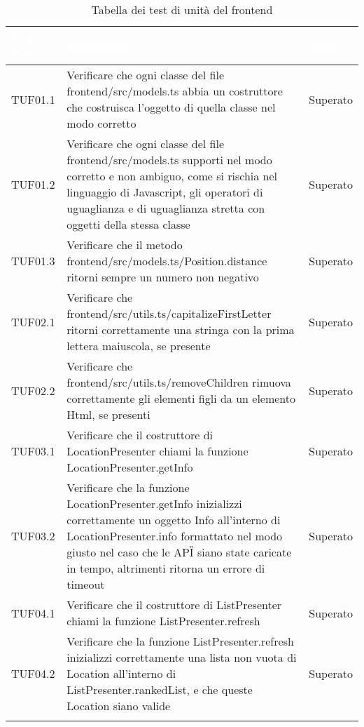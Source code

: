    {
        \setlength{\freewidth}{\dimexpr\textwidth-10\tabcolsep}
        \renewcommand{\arraystretch}{1.5}
        \centering
        \setlength{\aboverulesep}{0pt}
        \setlength{\belowrulesep}{0pt}
        \begin{longtable}{C{.3\freewidth} C{.5\freewidth} C{.3\freewidth}}
        \toprule
        \textcolor{white}{\textbf{Codice Test}}&
        \textcolor{white}{\textbf{Descrizione}}&
        \textcolor{white}{\textbf{Stato}}\\	
        \toprule
        \endhead

        TUF01.1 & Verificare che ogni classe del file frontend/src/models.ts
                abbia un costruttore che costruisca l'oggetto di quella classe nel modo corretto & Superato \\

        TUF01.2 & Verificare che ogni classe del file frontend/src/models.ts
                supporti nel modo corretto e non ambiguo, come si rischia nel linguaggio di Javascript,
                gli operatori di uguaglianza e di uguaglianza stretta con oggetti della stessa classe & Superato \\

        TUF01.3 & Verificare che il metodo frontend/src/models.ts/Position.distance
                ritorni sempre un numero non negativo & Superato \\

        TUF02.1 & Verificare che frontend/src/utils.ts/capitalizeFirstLetter
                ritorni correttamente una stringa con la prima lettera maiuscola, se presente & Superato \\

        TUF02.2 & Verificare che frontend/src/utils.ts/removeChildren
                rimuova correttamente gli elementi figli da un elemento Html, se presenti & Superato \\

        TUF03.1 & Verificare che il costruttore di LocationPresenter chiami la funzione LocationPresenter.getInfo & Superato \\

        TUF03.2 & Verificare che la funzione LocationPresenter.getInfo inizializzi correttamente un oggetto Info all'interno di LocationPresenter.info 
                formattato nel modo giusto nel caso che le API\G{} siano state caricate in tempo, altrimenti ritorna un errore di timeout & Superato \\

        TUF04.1 & Verificare che il costruttore di ListPresenter chiami la funzione ListPresenter.refresh & Superato \\

        TUF04.2 & Verificare che la funzione ListPresenter.refresh inizializzi correttamente una lista non vuota di Location all'interno di ListPresenter.rankedList, 
                e che queste Location siano valide & Superato \\

        \bottomrule
        \caption{Tabella dei test di unità del frontend}
        \end{longtable}
    }
 
